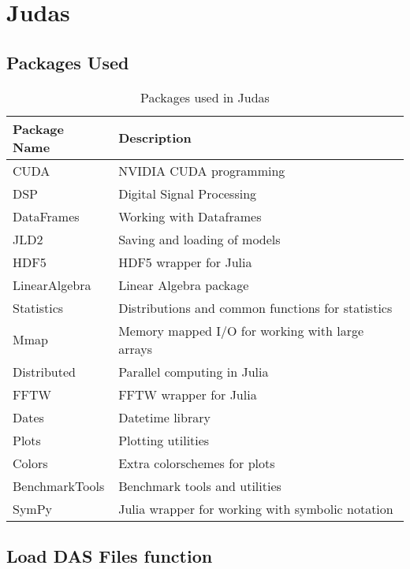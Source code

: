 \chapter{Judas}
\label{app:judas}


\section{Packages Used}
\label{app:jupacks}

\begin{table}[!h]
\centering
\caption{Packages used in Judas}
\label{tab:judas-packages}
\small
\begin{tabular}{>{\raggedright\arraybackslash}p{}>{\raggedright\arraybackslash}p{}}
\toprule
\textbf{Package Name} & \textbf{Description} \\
\midrule
CUDA & NVIDIA CUDA programming \\
\rowcolor{gray!10} DSP & Digital Signal Processing \\
DataFrames & Working with Dataframes \\
\rowcolor{gray!10} JLD2 & Saving and loading of models \\
HDF5 & HDF5 wrapper for Julia \\
\rowcolor{gray!10} LinearAlgebra & Linear Algebra package \\
Statistics & Distributions and common functions for statistics\\
\rowcolor{gray!10} Mmap & Memory mapped I/O for working with large arrays \\
Distributed & Parallel computing in Julia \\
\rowcolor{gray!10} FFTW & FFTW wrapper for Julia \\
Dates & Datetime library \\
\rowcolor{gray!10} Plots & Plotting utilities \\
Colors & Extra colorschemes for plots \\
\rowcolor{gray!10} BenchmarkTools & Benchmark tools and utilities \\
SymPy & Julia wrapper for working with symbolic notation \\
\bottomrule
\end{tabular}
\end{table}

\section{Load DAS Files function}
\label{app:loaddas}
